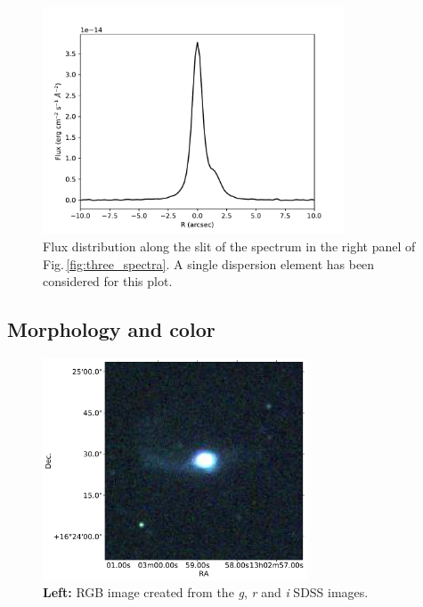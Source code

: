 \documentclass[../main.tex]{subfiles}
\begin{document}
\begin{figure}
\centering
\includegraphics[width=0.8\textwidth]{images/paper3/Radial_distr.pdf} 
\caption[]{Flux distribution along the slit of the spectrum in the right panel of Fig.\,\ref{fig:three_spectra}. A single dispersion element has been considered for this plot.}
\label{fig:flux_distr}
\end{figure}



\subsection{Morphology and color}
\label{sec:morph_color}

\begin{figure}
\centering
\includegraphics[width=0.7\textwidth]{images/paper3/new_rgb.pdf} %
\caption[]{\textbf{Left:} RGB image created from the \emph{g}, \emph{r} and \emph{i} SDSS images.} %
\label{fig:rgb_sdss}
\end{figure} 
\end{document}
